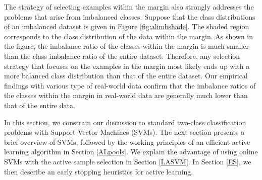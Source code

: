 The strategy of selecting examples within the margin also strongly addresses the problems that arise from imbalanced classes. Suppose that the class distributions of an imbalanced dataset is given in Figure \ref{fig:alimbshade}. The shaded region corresponds to the class distribution of the data within the margin. As shown in the figure, the imbalance ratio of the classes within the margin is much smaller than the class imbalance ratio of the entire dataset. Therefore, any selection strategy that focuses on the examples in the margin most likely ends up with a more balanced class distribution than that of the entire dataset. Our empirical findings with various type of real-world data confirm that the imbalance ratios of the classes within the margin in real-world data are generally much lower than that of the entire data.

In this section, we constrain our discussion to standard two-class classification problems with Support Vector Machines (SVMs). The next section presents a brief overview of SVMs, followed by the working principles of an efficient active learning algorithm in Section \ref{ALpools}. We explain the advantage of using online SVMs with the active sample selection in Section \ref{LASVM}. In Section \ref{ES}, we then describe an early stopping heuristics for active learning.

